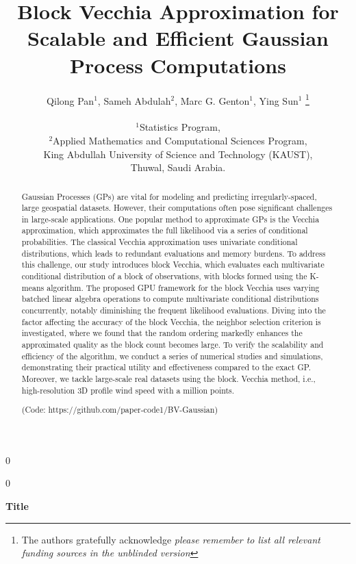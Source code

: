 \documentclass[12pt]{article}
\newcommand{\blind}{0}
\begin{document}


\def\spacingset#1{\renewcommand{\baselinestretch}%
{#1}\small\normalsize} \spacingset{1}



\blind
{
    \title{\bf Block Vecchia Approximation for Scalable and Efficient Gaussian Process Computations}
    \author{Qilong Pan$^{1}$, Sameh Abdulah$^2$, Marc G. Genton$^{1}$, Ying Sun$^{1}$ 
    \thanks{
    The authors gratefully acknowledge \textit{please remember to list all relevant funding sources in the unblinded version}}\hspace{.2cm}\\
    \\
     $^1$Statistics Program,\\
     $^2$Applied Mathematics and Computational Sciences Program, \\ 
    King Abdullah University of Science and Technology (KAUST),\\ Thuwal, Saudi Arabia.
    }
  \maketitle
} \fi

\blind
{
  \bigskip
  \bigskip
  \bigskip
  \begin{center}
    {\LARGE\bf Title}
\end{center}
  \medskip
} \fi

\bigskip
\begin{abstract}
Gaussian Processes (GPs) are vital for modeling and predicting irregularly-spaced, large geospatial datasets. However, their computations often pose significant challenges in large-scale applications. One popular method to approximate GPs is the Vecchia approximation, which approximates the full likelihood via a series of conditional probabilities. The classical Vecchia approximation uses univariate conditional distributions, which leads to redundant evaluations and memory burdens. To address this challenge, our study introduces block Vecchia, which evaluates each multivariate conditional distribution of a block of observations, with blocks formed using the K-means algorithm. The proposed GPU framework for the block Vecchia uses varying batched linear algebra operations to compute multivariate conditional distributions concurrently, notably diminishing the frequent likelihood evaluations. Diving into the factor affecting the accuracy of the block Vecchia, the neighbor selection criterion is investigated, where we found that the random ordering markedly enhances the approximated quality as the block count becomes large. To verify the scalability and efficiency of the algorithm, we conduct a series of numerical studies and simulations, demonstrating their practical utility and effectiveness compared to the exact GP. Moreover, we tackle large-scale real datasets using the block.
Vecchia method, i.e., high-resolution 3D profile wind speed with a million points. 

(Code: https://github.com/paper-code1/BV-Gaussian)

\end{abstract}
\end{document}
